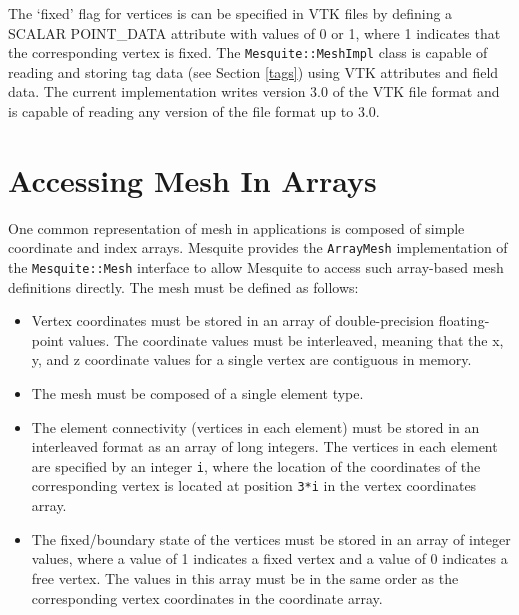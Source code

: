 The `fixed' flag for vertices is can be specified in VTK files by defining a
SCALAR POINT\_DATA attribute with values of 0 or 1, where 1 indicates that the
corresponding vertex is fixed.  The \texttt{Mesquite::MeshImpl} class is capable
of reading and storing tag data (see Section \ref{tags}) using VTK attributes and
field data.  The current implementation writes version 3.0 of the VTK file format
and is capable of reading any version of the file format up to 3.0.  

\section{Accessing Mesh In Arrays} \label{sec::ArrayMesh}

One common representation of mesh in applications is composed of simple 
coordinate and index arrays.  Mesquite provides the \texttt{ArrayMesh} implementation of the \texttt{Mesquite::Mesh} interface to allow Mesquite
to access such array-based mesh definitions directly.  The mesh must be
defined as follows:
\begin{itemize}
\item Vertex coordinates must be stored in an array of double-precision
      floating-point values.  The coordinate values must be interleaved,
      meaning that the x, y, and z coordinate values for a single vertex
      are contiguous in memory.
\item The mesh must be composed of a single element type.
\item The element connectivity (vertices in each element) must be stored
      in an interleaved format as an array of long integers.  The vertices
      in each element are specified by an integer \texttt{i}, where the location       of the coordinates of the corresponding vertex is located at position
      \texttt{3*i} in the vertex coordinates array.
\item The fixed/boundary state of the vertices must be stored in an array
      of integer values, where a value of 1 indicates a fixed vertex and a 
      value of 0 indicates a free vertex.  The values in this array must
      be in the same order as the corresponding vertex coordinates in the
      coordinate array.
\end{itemize}

